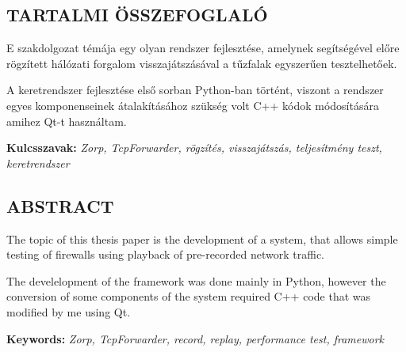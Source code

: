 \documentclass[a4paper,12pt,oneside]{report}
\begin{document}
\newpage

\begin{center}
\section*{\textbf{\Large \MakeUppercase{Tartalmi összefoglaló}}}
\end{center}

E szakdolgozat témája egy olyan rendszer fejlesztése, amelynek segítségével előre rögzített hálózati forgalom visszajátszásával a tűzfalak egyszerűen tesztelhetőek.

A keretrendszer fejlesztése első sorban Python-ban történt, viszont a rendszer egyes komponenseinek átalakításához szükség volt C++ kódok módosítására amihez Qt-t használtam.

\vspace{2cm}

{\bf Kulcsszavak:} {\it Zorp, TcpForwarder, rögzítés, visszajátszás, teljesítmény teszt, keretrendszer}
\newpage

\newpage

\begin{center}
\section*{\textbf{\Large \MakeUppercase{Abstract}}}
\end{center}

The topic of this thesis paper is the development of a system, that allows simple testing of firewalls using playback of pre-recorded network traffic.

The develelopment of the framework was done mainly in Python, however the conversion of some components of the system required C++ code that was modified by me using Qt.

\vspace{2cm}

{\bf Keywords:} {\it Zorp, TcpForwarder, record, replay, performance test, framework}
\newpage

\renewcommand{\thefigure}{\arabic{figure}}


\setcounter{tocdepth}{3} %
\thispagestyle{empty}
\tableofcontents
\pagebreak

\setcounter{page}{1} %
\pagestyle{plain}
\fancyhead[C]{\rightmark}
\fancyfoot[R]{\thepage}
\end{document}
